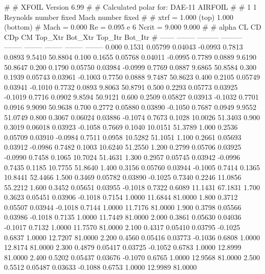 #  
#       XFOIL         Version 6.99
#  
# Calculated polar for: DAE-11 AIRFOIL                                  
#  
# 1 1 Reynolds number fixed          Mach number fixed         
#  
# xtrf =   1.000 (top)        1.000 (bottom)  
# Mach =   0.000     Re =     0.095 e 6     Ncrit =   9.000  9.000
#  
#   alpha    CL        CD       CDp       CM     Top_Xtr  Bot_Xtr  Top_Itr  Bot_Itr
#  ------ -------- --------- --------- -------- -------- -------- -------- --------
   0.000   0.1531   0.05799   0.04043  -0.0993   0.7813   0.0893   9.5410  50.8804
   0.100   0.1655   0.05768   0.04011  -0.0995   0.7789   0.0889   9.6190  50.8647
   0.200   0.1790   0.05750   0.03984  -0.0999   0.7769   0.0887   9.6865  50.8584
   0.300   0.1939   0.05743   0.03961  -0.1003   0.7750   0.0888   9.7487  50.8623
   0.400   0.2105   0.05749   0.03941  -0.1010   0.7732   0.0893   9.8063  50.8791
   0.500   0.2293   0.05773   0.03925  -0.1019   0.7716   0.0902   9.8594  50.9121
   0.600   0.2509   0.05827   0.03913  -0.1032   0.7701   0.0916   9.9090  50.9638
   0.700   0.2772   0.05880   0.03890  -0.1050   0.7687   0.0949   9.9552  51.0749
   0.800   0.3067   0.06024   0.03886  -0.1074   0.7673   0.1028  10.0026  51.3403
   0.900   0.3019   0.06018   0.03923  -0.1058   0.7669   0.1040  10.0151  51.3789
   1.000   0.2536   0.05709   0.03910  -0.0984   0.7511   0.0958  10.5282  51.1051
   1.100   0.2661   0.05693   0.03912  -0.0986   0.7482   0.1003  10.6240  51.2550
   1.200   0.2799   0.05706   0.03925  -0.0990   0.7458   0.1065  10.7024  51.4631
   1.300   0.2957   0.05745   0.03942  -0.0996   0.7435   0.1185  10.7755  51.8640
   1.400   0.3156   0.05760   0.03944  -0.1005   0.7414   0.1365  10.8441  52.4466
   1.500   0.3469   0.05782   0.03890  -0.1025   0.7340   0.2246  11.0856  55.2212
   1.600   0.3452   0.05651   0.03955  -0.1018   0.7322   0.6089  11.1431  67.1831
   1.700   0.3623   0.05451   0.03906  -0.1018   0.7154   1.0000  11.6844  81.0000
   1.800   0.3712   0.05507   0.03944  -0.1018   0.7144   1.0000  11.7176  81.0000
   1.900   0.3798   0.05566   0.03986  -0.1018   0.7135   1.0000  11.7449  81.0000
   2.000   0.3861   0.05630   0.04036  -0.1017   0.7132   1.0000  11.7570  81.0000
   2.100   0.4317   0.05410   0.03795  -0.1025   0.6837   1.0000  12.7207  81.0000
   2.200   0.4560   0.05416   0.03773  -0.1036   0.6808   1.0000  12.8174  81.0000
   2.300   0.4879   0.05417   0.03725  -0.1052   0.6783   1.0000  12.8999  81.0000
   2.400   0.5202   0.05437   0.03676  -0.1070   0.6765   1.0000  12.9568  81.0000
   2.500   0.5512   0.05487   0.03633  -0.1088   0.6753   1.0000  12.9989  81.0000
